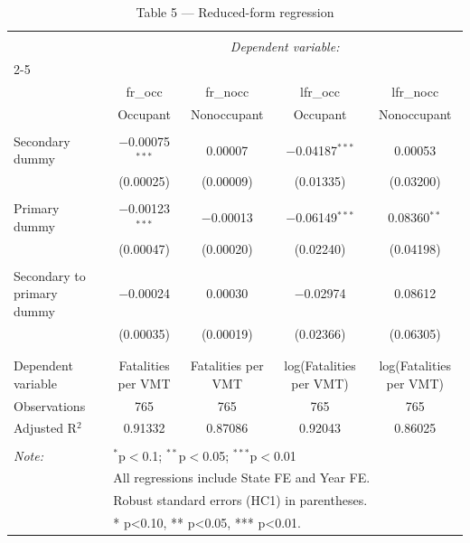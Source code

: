 
\begin{table}[!htbp] \centering 
  \caption{Table 5 --- Reduced-form regression} 
  \label{} 
\begin{tabular}{@{\extracolsep{5pt}}lcccc} 
\\[-1.8ex]\hline 
\hline \\[-1.8ex] 
 & \multicolumn{4}{c}{\textit{Dependent variable:}} \\ 
\cline{2-5} 
\\[-1.8ex] & fr\_occ & fr\_nocc & lfr\_occ & lfr\_nocc \\ 
 & Occupant & Nonoccupant & Occupant & Nonoccupant \\ 
\hline \\[-1.8ex] 
 Secondary dummy & $-$0.00075$^{***}$ & 0.00007 & $-$0.04187$^{***}$ & 0.00053 \\ 
  & (0.00025) & (0.00009) & (0.01335) & (0.03200) \\ 
  & & & & \\ 
 Primary dummy & $-$0.00123$^{***}$ & $-$0.00013 & $-$0.06149$^{***}$ & 0.08360$^{**}$ \\ 
  & (0.00047) & (0.00020) & (0.02240) & (0.04198) \\ 
  & & & & \\ 
 Secondary to primary dummy & $-$0.00024 & 0.00030 & $-$0.02974 & 0.08612 \\ 
  & (0.00035) & (0.00019) & (0.02366) & (0.06305) \\ 
  & & & & \\ 
\hline \\[-1.8ex] 
Dependent variable & Fatalities per VMT & Fatalities per VMT & log(Fatalities per VMT) & log(Fatalities per VMT) \\ 
Observations & 765 & 765 & 765 & 765 \\ 
Adjusted R$^{2}$ & 0.91332 & 0.87086 & 0.92043 & 0.86025 \\ 
\hline 
\hline \\[-1.8ex] 
\textit{Note:}  & \multicolumn{4}{l}{$^{*}$p$<$0.1; $^{**}$p$<$0.05; $^{***}$p$<$0.01} \\ 
 & \multicolumn{4}{l}{All regressions include State FE and Year FE.} \\ 
 & \multicolumn{4}{l}{Robust standard errors (HC1) in parentheses.} \\ 
 & \multicolumn{4}{l}{* p<0.10, ** p<0.05, *** p<0.01.} \\ 
\end{tabular} 
\end{table} 
